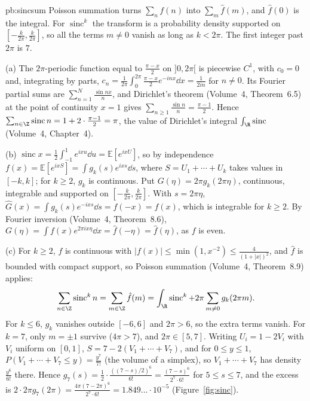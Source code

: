 \begin{solution}{pb:sincsum}
\idea Poisson summation turns $\sum_nf(n)$ into $\sum_m\hat f(m)$, and $\hat f(0)$ is the integral. For $\operatorname{sinc}^k$ the transform is a probability
density supported on $[-\frac k{2\pi},\frac k{2\pi}]$, so all the terms $m\ne0$ vanish as long as $k<2\pi$. The first integer past $2\pi$ is $7$.

\writeup (a) The $2\pi$-periodic function equal to $\frac{\pi-x}2$ on $]0,2\pi[$ is piecewise $C^1$, with $c_0=0$ and, integrating by parts,
$c_n=\frac1{2\pi}\int_0^{2\pi}\frac{\pi-x}2e^{-inx}\dd x=\frac1{2in}$ for $n\ne0$. Its Fourier partial sums are $\sum_{n=1}^N\frac{\sin nx}n$, and Dirichlet's theorem
(Volume~4, Theorem~6.5) at the point of continuity $x=1$ gives $\sum_{n\ge1}\frac{\sin n}n=\frac{\pi-1}2$. Hence
$\sum_{n\in\Z}\operatorname{sinc}n=1+2\cdot\frac{\pi-1}2=\pi$, the value of Dirichlet's integral $\int_{\R}\operatorname{sinc}$ (Volume~4, Chapter~4).

(b) $\operatorname{sinc}x=\frac12\int_{-1}^1e^{ixu}\dd u=\mathbb E[e^{ixU}]$, so by independence $f(x)=\mathbb E[e^{ixS}]=\int g_k(s)e^{ixs}\dd s$, where $S=U_1+\cdots+U_k$ takes values in
$[-k,k]$; for $k\ge2$, $g_k$ is continuous. Put $G(\eta)=2\pi g_k(2\pi\eta)$, continuous, integrable and supported on $[-\frac k{2\pi},\frac k{2\pi}]$. With $s=2\pi\eta$,
$\hat G(x)=\int g_k(s)e^{-ixs}\dd s=f(-x)=f(x)$, which is integrable for $k\ge2$. By Fourier inversion (Volume~4, Theorem~8.6),
$G(\eta)=\int f(x)e^{2\pi ix\eta}\dd x=\hat f(-\eta)=\hat f(\eta)$, as $f$ is even.

(c) For $k\ge2$, $f$ is continuous with $|f(x)|\le\min(1,x^{-2})\le\frac4{(1+|x|)^2}$, and $\hat f$ is bounded with compact support, so Poisson summation
(Volume~4, Theorem~8.9) applies:
\[
\sum_{n\in\Z}\operatorname{sinc}^kn=\sum_{m\in\Z}\hat f(m)=\int_{\R}\operatorname{sinc}^k+2\pi\sum_{m\ne0}g_k(2\pi m).
\]
For $k\le6$, $g_k$ vanishes outside $[-6,6]$ and $2\pi>6$, so the extra terms vanish. For $k=7$, only $m=\pm1$ survive ($4\pi>7$), and $2\pi\in[5,7]$.
Writing $U_i=1-2V_i$ with $V_i$ uniform on $[0,1]$, $S=7-2(V_1+\cdots+V_7)$, and for $0\le y\le1$, $P(V_1+\cdots+V_7\le y)=\frac{y^7}{7!}$ (the volume of a
simplex), so $V_1+\cdots+V_7$ has density $\frac{y^6}{6!}$ there. Hence $g_7(s)=\frac12\cdot\frac{((7-s)/2)^6}{6!}=\frac{(7-s)^6}{2^7\cdot6!}$ for $5\le s\le7$, and the excess is
$2\cdot2\pi g_7(2\pi)=\frac{4\pi(7-2\pi)^6}{2^7\cdot6!}=1.849\ldots\cdot10^{-5}$ (Figure~\ref{fig:sinc}).


\end{solution}
